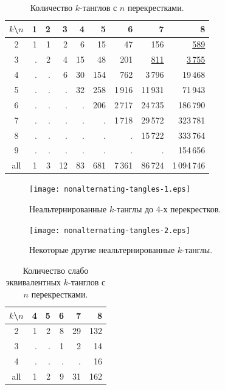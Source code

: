 \documentclass[12pt]{article}
\theoremstyle{plain}
\theoremstyle{definition}
\begin{document}
		\begin{table}[ht]
			\caption{Количество $k$-танглов с $n$ перекрестками.\label{table:non-alternating-tangles}}
			\centering
			\let\ul=\underline
			\begin{tabular}{|c||r|r|r|r|r|r|r|r|}
			\hline
			$k$\textbackslash $n$
			    & 1 & 2 &  3 &  4 &   5 &      6 &        7 &           8 \\
			\hline\hline
			2   & 1 & 1 &  2 &  6 &  15 &     47 &      156 &    \ul{589} \\
			3   & . & 2 &  4 & 15 &  48 &    201 & \ul{811} & \ul{3\,755} \\
			4   & . & . &  6 & 30 & 154 &    762 &   3\,796 &     19\,468 \\
			5   & . & . &  . & 32 & 258 & 1\,916 &  11\,931 &     71\,943 \\
			6   & . & . &  . &  . & 206 & 2\,717 &  24\,735 &    186\,790 \\
			7   & . & . &  . &  . &   . & 1\,718 &  29\,572 &    323\,781 \\
			8   & . & . &  . &  . &   . &      . &  15\,722 &    333\,764 \\
			9   & . & . &  . &  . &   . &      . &        . &    154\,656 \\
			\hline
			all & 1 & 3 & 12 & 83 & 681 & 7\,361 &  86\,724 & 1\,094\,746 \\
			\hline
			\end{tabular}
		\end{table}

		\begin{figure}[ht]
			\centering
			\texttt{[image: nonalternating-tangles-1.eps]}
			\caption{\footnotesize Неальтернированные $k$-танглы до 4-х перекрестков.\label{figure:nonalternating-tangles-4}}
		\end{figure}

		\begin{figure}[ht]
			\centering
			\texttt{[image: nonalternating-tangles-2.eps]}
			\caption{\footnotesize Некоторые другие неальтернированные $k$-танглы.\label{figure:nonalternating-tangles-rest}}
		\end{figure}

		\begin{table}[ht]
			\caption{Количество слабо эквивалентных $k$-танглов с $n$ перекрестками.\label{table:weak-tangles}}
			\centering
			\begin{tabular}{|c||r|r|r|r|r|}
			\hline
			$k$\textbackslash $n$
			    & 4 & 5 & 6 &  7 &   8 \\
			\hline\hline
			2   & 1 & 2 & 8 & 29 & 132 \\
			3   & . & . & 1 &  2 &  14 \\
			4   & . & . & . &  . &  16 \\
			\hline
			all & 1 & 2 & 9 & 31 & 162 \\
			\hline
			\end{tabular}
		\end{table}
\end{document}
